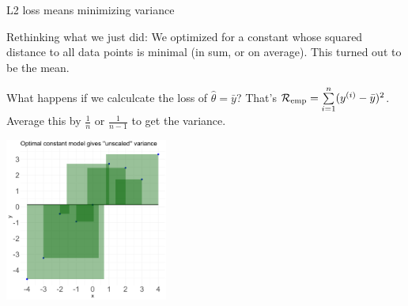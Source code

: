 \documentclass[11pt,compress,t,notes=noshow, xcolor=table]{beamer}
\begin{document}
\begin{vbframe}{L2 loss means minimizing variance}

Rethinking what we just did:
We optimized for a constant whose squared distance to all data points is minimal
(in sum, or on average). This turned out to be the mean.

\vspace{0.1cm}

What happens if we calculcate the loss of $\hat{\theta} = \bar{y}$? That's $\mathcal{R}_{\text{emp}} = \sum\limits_{i=1}^n (y^{(i)} - \bar{y})^2$. Average this by $\frac{1}{n}$ or $\frac{1}{n-1}$ to get the variance. 

\begin{center}
\includegraphics[width=0.4\textwidth]{figure_man/plot_const_var.png} \\
\end{center}


\end{vbframe}



\endlecture
\end{document}

